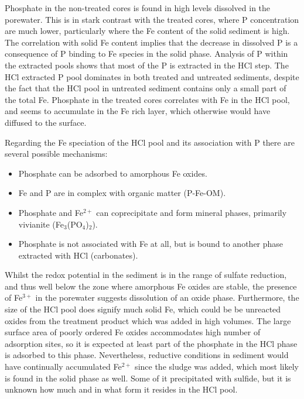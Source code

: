 \documentclass[a4paper,11pt]{article}
\begin{document}
Phosphate in the non-treated cores is found in high levels dissolved in the porewater. This is in stark contrast with the treated cores, where P concentration are much lower, particularly where the Fe content of the solid sediment is high. The correlation with solid Fe content implies that the decrease in dissolved P is a consequence of P binding to Fe species in the solid phase. Analysis of P within the extracted pools shows that most of the P is extracted in the HCl step. The HCl extracted P pool dominates in both treated and untreated sediments, despite the fact that the HCl pool in untreated sediment contains only a small part of the total Fe. Phosphate in the treated cores correlates with Fe in the HCl pool, and seems to accumulate in the Fe rich layer, which otherwise would have diffused to the surface.

Regarding the Fe speciation of the HCl pool and its association with P there are several possible mechanisms:
\begin{itemize}
\item
  Phosphate can be adsorbed to amorphous Fe oxides.
\item
  Fe and P are in complex with organic matter (P-Fe-OM).
\item
  Phosphate and Fe\(^{2+}\) can coprecipitate and form mineral phases, primarily vivianite (Fe\(_3\)(PO\(_4\))\(_2\)).
\item
  Phosphate is not associated with Fe at all, but is bound to another phase extracted with HCl (carbonates).
\end{itemize}
Whilst the redox potential in the sediment is in the range of sulfate reduction, and thus well below the zone where amorphous Fe oxides are stable, the presence of Fe\(^{3+}\) in the porewater suggests dissolution of an oxide phase. Furthermore, the size of the HCl pool does signify much solid Fe, which could be be unreacted oxides from the treatment product which was added in high volumes. The large surface area of poorly ordered Fe oxides accommodates high number of adsorption sites, so it is expected at least part of the phosphate in the HCl phase is adsorbed to this phase.
Nevertheless, reductive conditions in sediment would have continually accumulated Fe\(^{2+}\) since the sludge was added, which most likely is found in the solid phase as well. Some of it precipitated with sulfide, but it is unknown how much and in what form it resides in the HCl pool.
\end{document}
